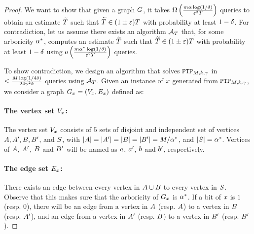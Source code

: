 \begin{proof}


We want to show that given a graph $G$, it takes $\Omega\left({\frac{m\alpha\log\left({1/\delta}\right)}{\varepsilon^2T}}\right)$ queries to obtain an estimate $\widetilde{T}$ such that $\widetilde{T} \in (1\pm \varepsilon)T$ with probability at least $1-\delta$. For contradiction, let us assume there exists an algorithm $\mathcal{A}_{T}$ that, for some arboricity $\alpha^*$, computes an estimate $\widetilde{T}$ such that $\widetilde{T} \in (1\pm \varepsilon)T$ with probability at least $1-\delta$ using $o\left({{\frac{m\alpha^*\log\left({1/\delta}\right)}{\varepsilon^2T}}}\right)$ queries. 



    To show contradiction, we design an algorithm that solves $\texttt{PTP}_{M,k,\gamma}$ in $<\frac{M\log\left({1/4\delta}\right)}{24\gamma^2k}$ queries using $\mathcal{A}_{T}$. Given an instance of $x$ generated from $\texttt{PTP}_{M,k,\gamma}$, we consider a graph ${G_{x}} = (V_x, E_x)$ defined as: 
    \paragraph*{The vertex set $V_x$:} The vertex set $V_x$ consists of $5$ sets of disjoint and independent set of vertices $A, A', B, B'$, and $S$, with $\left|{A}\right| = \left|{A'}\right| = \left|{B}\right| = \left|{B'}\right| = M/\alpha^*$, and $\left|{S}\right| = \alpha^*$. Vertices of $A$, $A'$, $B$ and $B'$ will be named as $a$, $a'$, $b$ and $b'$, respectively. 
    \paragraph*{The edge set $E_x$:} There exists an edge between every vertex in $A \cup B$ to every vertex in $S$. Observe that this makes sure that the arboricity of ${G_{x}}$ is $\alpha^*$. If a bit of $x$ is $1$ (resp. $0$), there will be an edge from a vertex in $A$ (resp. $A$) to a vertex in $B$ (resp. $A'$), and an edge from a vertex in $A'$ (resp. $B$) to a vertex in $B'$ (resp. $B'$).
        

\end{proof}
